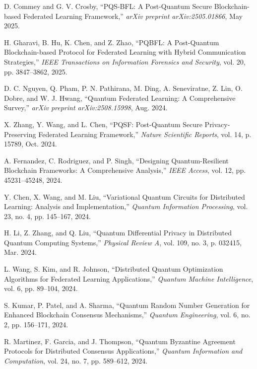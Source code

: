 \documentclass[10pt,journal,compsoc]{IEEEtran}
\begin{document}

\begin{thebibliography}{30}

D. Commey and G. V. Crosby, ``PQS-BFL: A Post-Quantum Secure Blockchain-based Federated Learning Framework,'' \textit{arXiv preprint arXiv:2505.01866}, May 2025.

H. Gharavi, B. Hu, K. Chen, and Z. Zhao, ``PQBFL: A Post-Quantum Blockchain-based Protocol for Federated Learning with Hybrid Communication Strategies,'' \textit{IEEE Transactions on Information Forensics and Security}, vol. 20, pp. 3847--3862, 2025.

D. C. Nguyen, Q. Pham, P. N. Pathirana, M. Ding, A. Seneviratne, Z. Lin, O. Dobre, and W. J. Hwang, ``Quantum Federated Learning: A Comprehensive Survey,'' \textit{arXiv preprint arXiv:2508.15998}, Aug. 2024.

X. Zhang, Y. Wang, and L. Chen, ``PQSF: Post-Quantum Secure Privacy-Preserving Federated Learning Framework,'' \textit{Nature Scientific Reports}, vol. 14, p. 15789, Oct. 2024.

A. Fernandez, C. Rodriguez, and P. Singh, ``Designing Quantum-Resilient Blockchain Frameworks: A Comprehensive Analysis,'' \textit{IEEE Access}, vol. 12, pp. 45231--45248, 2024.

Y. Chen, X. Wang, and M. Liu, ``Variational Quantum Circuits for Distributed Learning: Analysis and Implementation,'' \textit{Quantum Information Processing}, vol. 23, no. 4, pp. 145--167, 2024.

H. Li, Z. Zhang, and Q. Liu, ``Quantum Differential Privacy in Distributed Quantum Computing Systems,'' \textit{Physical Review A}, vol. 109, no. 3, p. 032415, Mar. 2024.

L. Wang, S. Kim, and R. Johnson, ``Distributed Quantum Optimization Algorithms for Federated Learning Applications,'' \textit{Quantum Machine Intelligence}, vol. 6, pp. 89--104, 2024.

S. Kumar, P. Patel, and A. Sharma, ``Quantum Random Number Generation for Enhanced Blockchain Consensus Mechanisms,'' \textit{Quantum Engineering}, vol. 6, no. 2, pp. 156--171, 2024.

R. Martinez, F. Garcia, and J. Thompson, ``Quantum Byzantine Agreement Protocols for Distributed Consensus Applications,'' \textit{Quantum Information and Computation}, vol. 24, no. 7, pp. 589--612, 2024.


\end{thebibliography}
\end{document}
